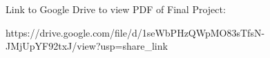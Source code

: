 Link to Google Drive  to view PDF of Final Project:

https://drive.google.com/file/d/1seWbPHzQWpMO83sTfsN-JMjUpYF92txJ/view?usp=share_link